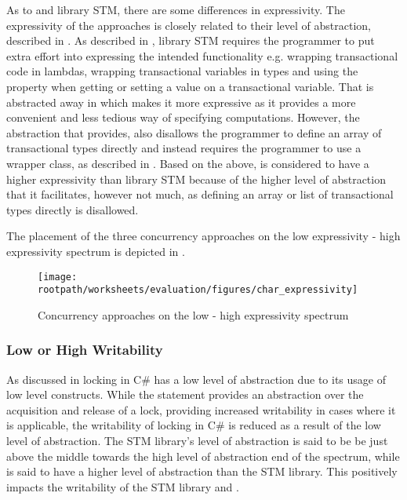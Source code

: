 As to \stmname and library \ac{STM}, there are some differences in expressivity. The expressivity of the approaches is closely related to their level of abstraction, described in . As described in , library \ac{STM} requires the programmer to put extra effort into expressing the intended functionality e.g. wrapping transactional code in lambdas, wrapping transactional variables in  types and using the  property when getting or setting a value on a transactional variable. That is abstracted away in \stmname which makes it more expressive as it provides a more convenient and less tedious way of specifying computations. However, the abstraction that \stmname provides, also disallows the programmer to define an array of transactional types directly and instead requires the programmer to use a wrapper class, as described in . Based on the above, \stmname is considered to have a higher expressivity than library \ac{STM} because of the higher level of abstraction that it facilitates, however not much, as defining an array or list of transactional types directly is disallowed.

The placement of the three concurrency approaches on the low expressivity - high expressivity spectrum is depicted in . 

\begin{figure}[htbp]
\centering
 \texttt{[image: \\rootpath/worksheets/evaluation/figures/char\_expressivity]} 
 \caption{Concurrency approaches on the low - high expressivity spectrum}
\label{fig:char_expressivity}
\end{figure}

\subsubsection{Low or High Writability}
As discussed in  locking in C\# has a low level of abstraction due to its usage of low level constructs. While the  statement provides an abstraction over the acquisition and release of a lock, providing increased writability in cases where it is applicable, the writability of locking in C\# is reduced as a result of the low level of abstraction. The \ac{STM} library's level of abstraction is said to be be just above the middle towards the high level of abstraction end of the spectrum, while \stmname is said to have a higher level of abstraction than the \ac{STM} library. This positively impacts the writability of the \ac{STM} library and \stmname.

